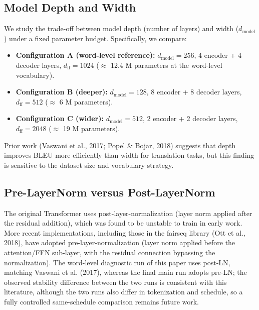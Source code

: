 \subsection{Model Depth and Width}

We study the trade-off between model depth (number of layers) and width ($d_{\text{model}}$) under a fixed parameter budget. Specifically, we compare:

\begin{itemize}
\item \textbf{Configuration A (word-level reference):} $d_{\text{model}}=256$, 4 encoder + 4 decoder layers, $d_{\text{ff}}=1024$ ($\approx$ 12.4 M parameters at the word-level vocabulary).
\item \textbf{Configuration B (deeper):} $d_{\text{model}}=128$, 8 encoder + 8 decoder layers, $d_{\text{ff}}=512$ ($\approx$ 6 M parameters).
\item \textbf{Configuration C (wider):} $d_{\text{model}}=512$, 2 encoder + 2 decoder layers, $d_{\text{ff}}=2048$ ($\approx$ 19 M parameters).
\end{itemize}

Prior work (Vaswani et al., 2017; Popel \& Bojar, 2018) suggests that depth improves BLEU more efficiently than width for translation tasks, but this finding is sensitive to the dataset size and vocabulary strategy.

\subsection{Pre-LayerNorm versus Post-LayerNorm}

The original Transformer uses post-layer-normalization (layer norm applied after the residual addition), which was found to be unstable to train in early work. More recent implementations, including those in the fairseq library (Ott et al., 2018), have adopted pre-layer-normalization (layer norm applied before the attention/FFN sub-layer, with the residual connection bypassing the normalization). The word-level diagnostic run of this paper uses post-LN, matching Vaswani et al. (2017), whereas the final main run adopts pre-LN; the observed stability difference between the two runs is consistent with this literature, although the two runs also differ in tokenization and schedule, so a fully controlled same-schedule comparison remains future work.


